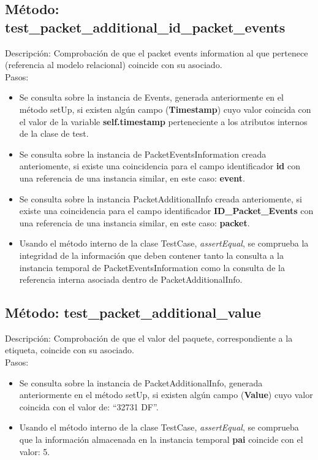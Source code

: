 

\subsection{\quad Método: test\_packet\_additional\_id\_packet\_events}

Descripción: Comprobación de que el packet events information al que pertenece (referencia al modelo relacional) coincide con su asociado.\\
Pasos:
\begin{itemize}
\item Se consulta sobre la instancia de Events, generada anteriormente en el método setUp, si existen algún campo (\textbf{Timestamp}) cuyo valor coincida con el valor de la variable \textbf{self.timestamp} perteneciente a los atributos internos de la clase de test.
\item Se consulta sobre la instancia de PacketEventsInformation creada anteriomente, si existe una coincidencia para el campo identificador \textbf{id} con una referencia de una instancia similar, en este caso: \textbf{event}.
\item Se consulta sobre la instancia PacketAdditionalInfo creada anteriomente, si existe una coincidencia para el campo identificador \textbf{ID\_Packet\_Events} con una referencia de una instancia similar, en este caso: \textbf{packet}.
\item Usando el método interno de la clase TestCase, \emph{assertEqual}, se comprueba la integridad de la información que deben contener tanto la consulta a la instancia temporal de PacketEventsInformation como la consulta de la referencia interna asociada dentro de PacketAdditionalInfo.
\end{itemize}



\subsection{\quad Método: test\_packet\_additional\_value}

Descripción: Comprobación de que el valor del paquete, correspondiente a la etiqueta, coincide con su asociado.\\
Pasos:
\begin{itemize}
\item Se consulta sobre la instancia de PacketAdditionalInfo, generada anteriormente en el método setUp, si existen algún campo (\textbf{Value}) cuyo valor coincida con el valor de: ``32731 DF''.
\item Usando el método interno de la clase TestCase, \emph{assertEqual}, se comprueba que la información almacenada en la instancia temporal \textbf{pai} coincide con el valor: 5.
\end{itemize}



